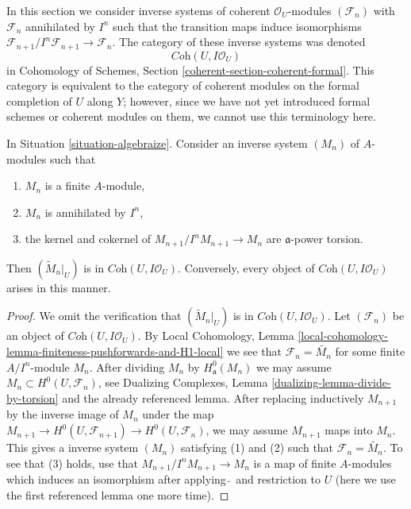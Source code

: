 \noindent
In this section we consider inverse systems of coherent
$\mathcal{O}_U$-modules $(\mathcal{F}_n)$ with $\mathcal{F}_n$
annihilated by $I^n$ such that the transition maps induce
isomorphisms $\mathcal{F}_{n + 1}/I^n\mathcal{F}_{n + 1} \to \mathcal{F}_n$.
The category of these inverse systems was denoted
$$
\textit{Coh}(U, I\mathcal{O}_U)
$$
in Cohomology of Schemes, Section \ref{coherent-section-coherent-formal}.
This category is equivalent to the category of coherent modules
on the formal completion of $U$ along $Y$; however, since we have
not yet introduced formal schemes or coherent modules on them,
we cannot use this terminology here.

\begin{lemma}
\label{lemma-system-of-modules}
In Situation \ref{situation-algebraize}.
Consider an inverse system $(M_n)$ of $A$-modules such
that
\begin{enumerate}
\item $M_n$ is a finite $A$-module,
\item $M_n$ is annihilated by $I^n$,
\item the kernel and cokernel of $M_{n + 1}/I^nM_{n + 1} \to M_n$
are $\mathfrak a$-power torsion.
\end{enumerate}
Then $(\widetilde{M}_n|_U)$ is in $\textit{Coh}(U, I\mathcal{O}_U)$.
Conversely, every object of $\textit{Coh}(U, I\mathcal{O}_U)$
arises in this manner.
\end{lemma}

\begin{proof}
We omit the verification that $(\widetilde{M}_n|_U)$ is in
$\textit{Coh}(U, I\mathcal{O}_U)$. Let $(\mathcal{F}_n)$
be an object of $\textit{Coh}(U, I\mathcal{O}_U)$.
By Local Cohomology, Lemma
\ref{local-cohomology-lemma-finiteness-pushforwards-and-H1-local}
we see that $\mathcal{F}_n = \widetilde{M_n}$ for some finite
$A/I^n$-module $M_n$. After dividing $M_n$ by $H^0_\mathfrak a(M_n)$
we may assume $M_n \subset H^0(U, \mathcal{F}_n)$, see
Dualizing Complexes, Lemma \ref{dualizing-lemma-divide-by-torsion}
and the already referenced lemma.
After replacing inductively $M_{n + 1}$ by the inverse image
of $M_n$ under the map $M_{n + 1} \to H^0(U, \mathcal{F}_{n + 1})
\to H^0(U, \mathcal{F}_n)$, we may assume $M_{n + 1}$ maps into
$M_n$. This gives a inverse system $(M_n)$ satisfying (1) and (2)
such that $\mathcal{F}_n = \widetilde{M_n}$. To see that (3)
holds, use that $M_{n + 1}/I^nM_{n + 1} \to M_n$ is a map
of finite $A$-modules which induces an isomorphism after
applying $\widetilde{\ }$ and restriction to $U$
(here we use the first referenced lemma one more time).
\end{proof}

